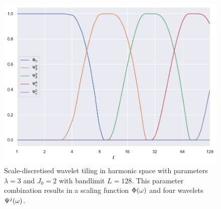 \begin{figure}[htpb]
	\centering\capstart{}
	\includegraphics[width=\textwidth]{axisymmetric_tiling_L128.pdf}
	\caption[
		The tiling of the harmonic line used in scale-discretised wavelets
	]{
		Scale-discretised wavelet tiling in harmonic space with parameters \(\lambda=3\) and \(J_{0}=2\) with bandlimit \(L=128\).
		This parameter combination results in a scaling function \(\Phi(\omega)\) and four wavelets \(\Psi^{j}(\omega)\).
	}\label{fig:chapter2_tiling}
\end{figure}
